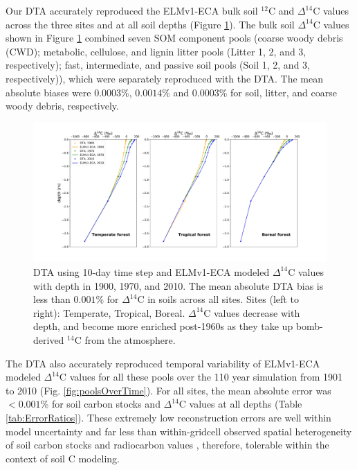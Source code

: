 \documentclass[draft]{agujournal2019}
\begin{document}
Our DTA accurately reproduced the ELMv1-ECA bulk soil  $^{12}$C and $\Delta^{14}$C values across the three sites and at all soil depths (Figure \ref{fig:depthProfiles}). The bulk soil $\Delta^{14}$C values shown in Figure \ref{fig:depthProfiles} combined seven SOM component pools (coarse woody debris (CWD); metabolic, cellulose, and lignin litter pools (Litter 1, 2, and 3, respectively); fast, intermediate, and passive soil pools (Soil 1, 2, and 3, respectively)), which were separately reproduced with the DTA. The mean absolute biases were $0.0003$\%, $0.0014$\% and $0.0003$\% for soil, litter, and coarse woody debris, respectively.

\begin{figure}[htbp]
        \centering 
        \includegraphics[width=1.1\linewidth]{figs/depth_profile_10.pdf}
        \caption{DTA using 10-day time step and ELMv1-ECA modeled $\Delta^{14}$C values with depth in 1900, 1970, and 2010. The mean absolute DTA bias is less than $0.001$\% for $\Delta^{14}$C in soils across all sites. Sites (left to right): Temperate, Tropical, Boreal. $\Delta^{14}$C values decrease with depth, and become more enriched post-1960s as they take up bomb-derived $^{14}$C from the atmosphere.
        \label{fig:depthProfiles}
        }
\end{figure}      
             

The DTA also accurately reproduced temporal variability of ELMv1-ECA modeled $\Delta^{14}$C values for all these pools over the 110 year simulation from 1901 to 2010 (Fig. \ref{fig:poolsOverTime}). For all sites, the mean absolute error was $<0.001$\% for soil carbon stocks and $\Delta^{14}$C values at all depths (Table \ref{tab:ErrorRatios}). These extremely low reconstruction errors are well within model uncertainty and far less than within-gridcell observed spatial heterogeneity of soil carbon stocks and radiocarbon values \cite{Chen2009JGR, Lawrence2019}, therefore, tolerable within the context of soil C modeling.
\end{document}
